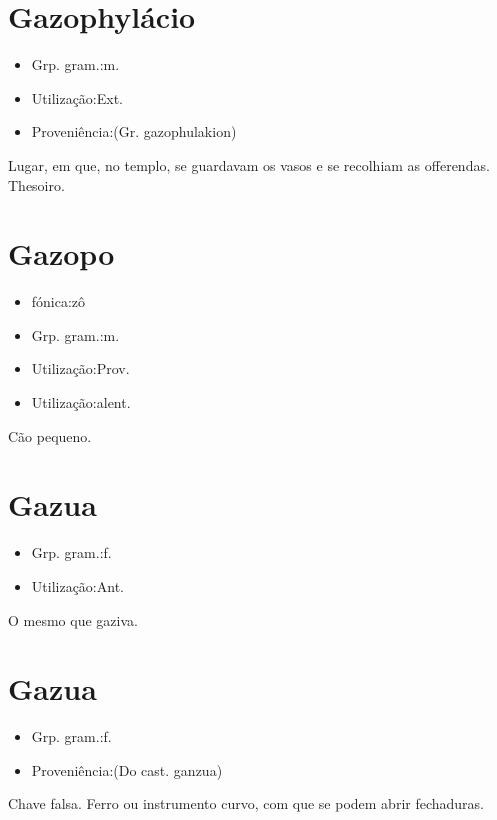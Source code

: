 \section{Gazophylácio}
\begin{itemize}
\item {Grp. gram.:m.}
\end{itemize}
\begin{itemize}
\item {Utilização:Ext.}
\end{itemize}
\begin{itemize}
\item {Proveniência:(Gr. \textunderscore gazophulakion\textunderscore )}
\end{itemize}
Lugar, em que, no templo, se guardavam os vasos e se recolhiam as offerendas.
Thesoiro.
\section{Gazopo}
\begin{itemize}
\item {fónica:zô}
\end{itemize}
\begin{itemize}
\item {Grp. gram.:m.}
\end{itemize}
\begin{itemize}
\item {Utilização:Prov.}
\end{itemize}
\begin{itemize}
\item {Utilização:alent.}
\end{itemize}
Cão pequeno.
\section{Gazua}
\begin{itemize}
\item {Grp. gram.:f.}
\end{itemize}
\begin{itemize}
\item {Utilização:Ant.}
\end{itemize}
O mesmo que \textunderscore gaziva\textunderscore .
\section{Gazua}
\begin{itemize}
\item {Grp. gram.:f.}
\end{itemize}
\begin{itemize}
\item {Proveniência:(Do cast. \textunderscore ganzua\textunderscore )}
\end{itemize}
Chave falsa.
Ferro ou instrumento curvo, com que se podem abrir fechaduras.

